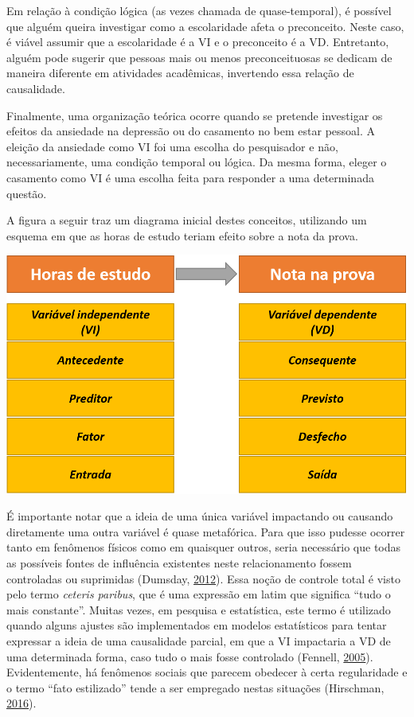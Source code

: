 \documentclass[
]{book}
\begin{document}
Em relação à condição lógica (as vezes chamada de quase-temporal), é
possível que alguém queira investigar como a escolaridade afeta o
preconceito. Neste caso, é viável assumir que a escolaridade é a VI e o
preconceito é a VD. Entretanto, alguém pode sugerir que pessoas mais ou
menos preconceituosas se dedicam de maneira diferente em atividades
acadêmicas, invertendo essa relação de causalidade.

Finalmente, uma organização teórica ocorre quando se pretende investigar
os efeitos da ansiedade na depressão ou do casamento no bem estar
pessoal. A eleição da ansiedade como VI foi uma escolha do pesquisador e
não, necessariamente, uma condição temporal ou lógica. Da mesma forma,
eleger o casamento como VI é uma escolha feita para responder a uma
determinada questão.

A figura a seguir traz um diagrama inicial destes conceitos, utilizando
um esquema em que as horas de estudo teriam efeito sobre a nota da
prova.

\includegraphics{./img/cap_vi_vd.png}

É importante notar que a ideia de uma única variável impactando ou
causando diretamente uma outra variável é quase metafórica. Para que
isso pudesse ocorrer tanto em fenômenos físicos como em quaisquer
outros, seria necessário que todas as possíveis fontes de influência
existentes neste relacionamento fossem controladas ou suprimidas
(Dumsday, \protect\hyperlink{ref-Dumsday2012}{2012}). Essa noção de
controle total é visto pelo termo \emph{ceteris paribus}, que é uma
expressão em latim que significa ``tudo o mais constante''. Muitas
vezes, em pesquisa e estatística, este termo é utilizado quando alguns
ajustes são implementados em modelos estatísticos para tentar expressar
a ideia de uma causalidade parcial, em que a VI impactaria a VD de uma
determinada forma, caso tudo o mais fosse controlado (Fennell,
\protect\hyperlink{ref-Fennell2005}{2005}). Evidentemente, há fenômenos
sociais que parecem obedecer à certa regularidade e o termo ``fato
estilizado'' tende a ser empregado nestas situações (Hirschman,
\protect\hyperlink{ref-Hirschman2016}{2016}).
\end{document}
